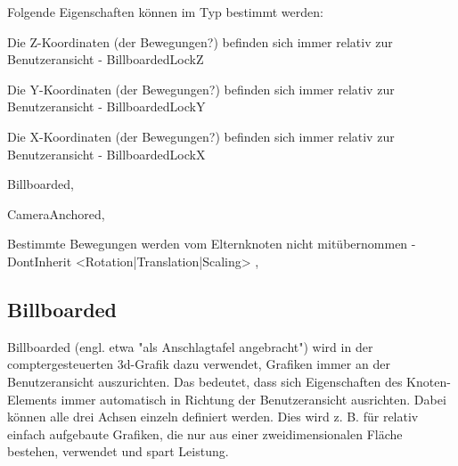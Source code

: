 Folgende Eigenschaften können im Typ bestimmt werden:
\item Die Z-Koordinaten (der Bewegungen?) befinden sich immer relativ zur Benutzeransicht - BillboardedLockZ
\item Die Y-Koordinaten (der Bewegungen?) befinden sich immer relativ zur Benutzeransicht - BillboardedLockY
\item Die X-Koordinaten (der Bewegungen?) befinden sich immer relativ zur Benutzeransicht - BillboardedLockX
\item Billboarded,
\item CameraAnchored,
\item Bestimmte Bewegungen werden vom Elternknoten nicht mitübernommen - DontInherit { <Rotation|Translation|Scaling> },

\subsection{Billboarded}
Billboarded (engl. etwa "als Anschlagtafel angebracht") wird in der comptergesteuerten 3d-Grafik dazu verwendet, Grafiken immer an der Benutzeransicht auszurichten. Das bedeutet, dass sich Eigenschaften des Knoten-Elements immer automatisch in Richtung der Benutzeransicht ausrichten. Dabei können alle drei Achsen einzeln definiert werden. Dies wird z. B. für relativ einfach aufgebaute Grafiken, die nur aus einer zweidimensionalen Fläche bestehen, verwendet und spart Leistung.

